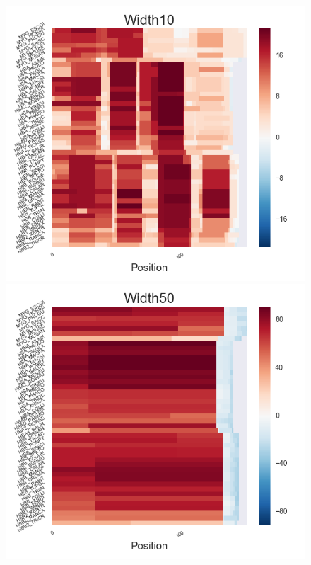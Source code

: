 \documentclass[11pt, oneside]{article}
\begin{document}
\begin{figure}[htbp]
  \centering
  \begin{minipage}{0.32\textwidth}
    \centering
    \includegraphics[width=1\textwidth]{images/Width10_heatmap} %
  \end{minipage}
  \hfill
  \begin{minipage}{0.32\textwidth}
    \centering
    \includegraphics[width=1\textwidth]{images/Width50_heatmap} %

\end{minipage}
\end{figure}
\end{document}
